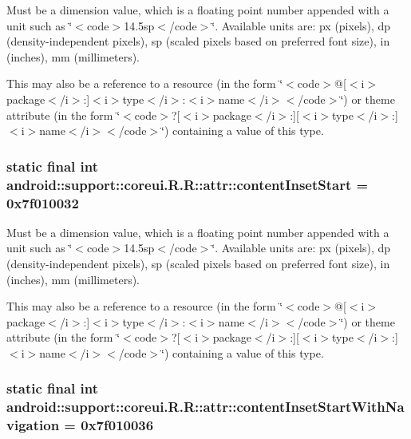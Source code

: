Must be a dimension value, which is a floating point number appended with a unit such as \char`\"{}$<$code$>$14.5sp$<$/code$>$\char`\"{}. Available units are: px (pixels), dp (density-independent pixels), sp (scaled pixels based on preferred font size), in (inches), mm (millimeters). 

This may also be a reference to a resource (in the form \char`\"{}$<$code$>$@\mbox{[}$<$i$>$package$<$/i$>$:\mbox{]}$<$i$>$type$<$/i$>$:$<$i$>$name$<$/i$>$$<$/code$>$\char`\"{}) or theme attribute (in the form \char`\"{}$<$code$>$?\mbox{[}$<$i$>$package$<$/i$>$:\mbox{]}\mbox{[}$<$i$>$type$<$/i$>$:\mbox{]}$<$i$>$name$<$/i$>$$<$/code$>$\char`\"{}) containing a value of this type. \hypertarget{classandroid_1_1support_1_1coreui_1_1_r_1_1attr_38798d3a994d04439b70d3a14b3ea67c}{
\subsubsection[{contentInsetStart}]{\setlength{\rightskip}{0pt plus 5cm}static final int android::support::coreui.R.R::attr::contentInsetStart = 0x7f010032}}
\label{classandroid_1_1support_1_1coreui_1_1_r_1_1attr_38798d3a994d04439b70d3a14b3ea67c}


Must be a dimension value, which is a floating point number appended with a unit such as \char`\"{}$<$code$>$14.5sp$<$/code$>$\char`\"{}. Available units are: px (pixels), dp (density-independent pixels), sp (scaled pixels based on preferred font size), in (inches), mm (millimeters). 

This may also be a reference to a resource (in the form \char`\"{}$<$code$>$@\mbox{[}$<$i$>$package$<$/i$>$:\mbox{]}$<$i$>$type$<$/i$>$:$<$i$>$name$<$/i$>$$<$/code$>$\char`\"{}) or theme attribute (in the form \char`\"{}$<$code$>$?\mbox{[}$<$i$>$package$<$/i$>$:\mbox{]}\mbox{[}$<$i$>$type$<$/i$>$:\mbox{]}$<$i$>$name$<$/i$>$$<$/code$>$\char`\"{}) containing a value of this type. \hypertarget{classandroid_1_1support_1_1coreui_1_1_r_1_1attr_0aaca43a14385aa4cabfe84531a8deda}{
\subsubsection[{contentInsetStartWithNavigation}]{\setlength{\rightskip}{0pt plus 5cm}static final int android::support::coreui.R.R::attr::contentInsetStartWithNavigation = 0x7f010036}}
\label{classandroid_1_1support_1_1coreui_1_1_r_1_1attr_0aaca43a14385aa4cabfe84531a8deda}


